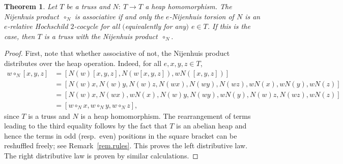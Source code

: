 \documentclass[10pt,a4paper]{amsart}
\numberwithin{equation}{section}
\newtheorem{Theorem}{Theorem}[section]
\begin{document}
\begin{Theorem} \label{2nd}
Let $T$ be a truss and $N\colon\ T\to T$ a heap homomorphism.
The Nijenhuis product~$\circ_{N}$ is associative if and only the $e$-Nijenhuis torsion of $N$ is an $e$-relative Hochschild $2$-cocycle for all $($equivalently for any$)$ $e\in T$. If this is the case, then $T$ is a truss with the Nijenhuis product~$\circ_{N}$.
\end{Theorem}
\begin{proof}
First, note that whether associative of not, the Nijenhuis product distributes over the heap operation. Indeed, for all $e,x,y,z\in T$,
\begin{align*}
w \circ_{N}[x,y,z]
&=\left[N(w)[x,y,z],N(w[x,y,z]),wN([x,y,z])\right] \\
&= \left[N(w)x,N(w)y ,N(w)z, N(wx),N(wy),N(wz), wN(x) ,wN(y) , wN(z)\right]\\
 &= \left[N(w)x,N(wx),wN(x), N(w)y,N(wy),wN(y), N(w)z,N(wz),wN(z)\right] \\
&=
[w \circ_{N}x,w \circ_{N}y,w \circ_{N}z],
\end{align*}
since $T$ is a truss and $N$ is a heap homomorphism. The rearrangement of terms leading to the third equality follows by the fact that $T$ is an abelian heap and hence the terms in odd (resp.\ even) positions in the square bracket can be reshuffled freely; see Remark~\ref{rem.rules}. This proves the left distributive law. The right distributive law is proven by similar calculations.


\end{proof}
\end{document}
